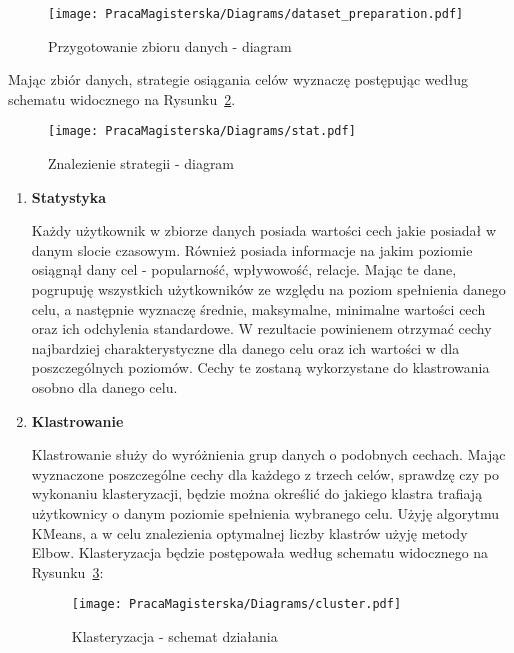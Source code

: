 \documentclass[polish,12pt]{aghthesis}
\begin{document}
 \begin{figure}[ht]
    \centering
    \texttt{[image: PracaMagisterska/Diagrams/dataset\_preparation.pdf]}
    \caption{Przygotowanie zbioru danych - diagram}
    \label{data_prep}
\end{figure}

    \FloatBarrier


Mając zbiór danych, strategie osiągania celów wyznaczę postępując według schematu widocznego na Rysunku~\ref{stat}.

 \begin{figure}[ht]
    \centering
    \texttt{[image: PracaMagisterska/Diagrams/stat.pdf]}
    \caption{Znalezienie strategii - diagram}
    \label{stat}
\end{figure}

    \FloatBarrier

\begin{enumerate}
    \item \textbf{Statystyka}
    
    Każdy użytkownik w zbiorze danych posiada wartości cech jakie posiadał w danym slocie czasowym. Również posiada informacje na jakim poziomie osiągnął dany cel - popularność, wpływowość, relacje. Mając te dane, pogrupuję wszystkich użytkowników ze względu na poziom spełnienia danego celu, a następnie wyznaczę średnie, maksymalne, minimalne wartości cech oraz ich odchylenia standardowe. W rezultacie powinienem otrzymać cechy najbardziej charakterystyczne dla danego celu oraz ich wartości w dla poszczególnych poziomów. Cechy te zostaną wykorzystane do klastrowania osobno dla danego celu.
 
    
    \item \textbf{Klastrowanie}
    
    Klastrowanie służy do wyróżnienia grup danych o podobnych cechach. Mając wyznaczone poszczególne cechy dla każdego z trzech celów, sprawdzę czy po wykonaniu klasteryzacji, będzie można określić do jakiego klastra trafiają użytkownicy o danym poziomie spełnienia wybranego celu. Użyję algorytmu KMeans\cite{kmeans}, a w celu znalezienia optymalnej liczby klastrów użyję metody Elbow\cite{elbow}. Klasteryzacja będzie postępowała według schematu widocznego na Rysunku~\ref{cluster}:
    
     \begin{figure}[ht]
    \centering
    \texttt{[image: PracaMagisterska/Diagrams/cluster.pdf]}
    \caption{Klasteryzacja - schemat działania}
    \label{cluster}
\end{figure}

    \FloatBarrier
\end{enumerate}
\end{document}

